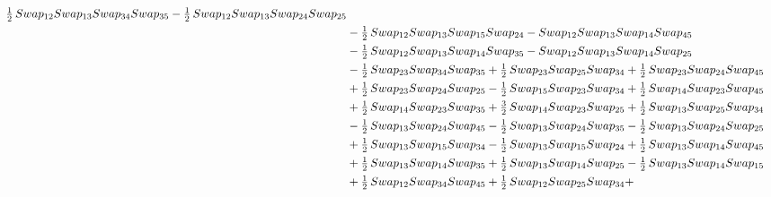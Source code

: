 \documentclass[10pt,a4paper]{amsart}
\begin{document}
\begin{align*}
        \tfrac12\,\textnormal{Swap}_{12} \textnormal{Swap}_{13} \textnormal{Swap}_{34} \textnormal{Swap}_{35} - \tfrac12\,\textnormal{Swap}_{12} \textnormal{Swap}_{13} \textnormal{Swap}_{24} \textnormal{Swap}_{25}\\ & - \tfrac12\,\textnormal{Swap}_{12} \textnormal{Swap}_{13} \textnormal{Swap}_{15} \textnormal{Swap}_{24} -
        \textnormal{Swap}_{12} \textnormal{Swap}_{13} \textnormal{Swap}_{14} \textnormal{Swap}_{45}\\ & - \tfrac12\,\textnormal{Swap}_{12} \textnormal{Swap}_{13} \textnormal{Swap}_{14} \textnormal{Swap}_{35} - \textnormal{Swap}_{12} \textnormal{Swap}_{13} \textnormal{Swap}_{14} \textnormal{Swap}_{25} \\ &-
        \tfrac12\,\textnormal{Swap}_{23} \textnormal{Swap}_{34} \textnormal{Swap}_{35} + \tfrac12\,\textnormal{Swap}_{23} \textnormal{Swap}_{25} \textnormal{Swap}_{34} + \tfrac12\,\textnormal{Swap}_{23} \textnormal{Swap}_{24} \textnormal{Swap}_{45}\\ & + \tfrac12\,\textnormal{Swap}_{23} \textnormal{Swap}_{24} \textnormal{Swap}_{25} -
        \tfrac12\,\textnormal{Swap}_{15} \textnormal{Swap}_{23} \textnormal{Swap}_{34} + \tfrac12\,\textnormal{Swap}_{14} \textnormal{Swap}_{23} \textnormal{Swap}_{45}\\ & + \tfrac12\,\textnormal{Swap}_{14} \textnormal{Swap}_{23} \textnormal{Swap}_{35} + \tfrac32\,\textnormal{Swap}_{14} \textnormal{Swap}_{23} \textnormal{Swap}_{25} +
        \tfrac12\,\textnormal{Swap}_{13} \textnormal{Swap}_{25} \textnormal{Swap}_{34}\\ & - \tfrac12\,\textnormal{Swap}_{13} \textnormal{Swap}_{24} \textnormal{Swap}_{45} - \tfrac12\,\textnormal{Swap}_{13} \textnormal{Swap}_{24} \textnormal{Swap}_{35} - \tfrac12\,\textnormal{Swap}_{13} \textnormal{Swap}_{24} \textnormal{Swap}_{25}\\ & +
        \tfrac12\,\textnormal{Swap}_{13} \textnormal{Swap}_{15} \textnormal{Swap}_{34} - \tfrac12\,\textnormal{Swap}_{13} \textnormal{Swap}_{15} \textnormal{Swap}_{24} + \tfrac12\,\textnormal{Swap}_{13} \textnormal{Swap}_{14} \textnormal{Swap}_{45}\\ & + \tfrac12\,\textnormal{Swap}_{13} \textnormal{Swap}_{14} \textnormal{Swap}_{35} +
        \tfrac12\,\textnormal{Swap}_{13} \textnormal{Swap}_{14} \textnormal{Swap}_{25} - \tfrac12\,\textnormal{Swap}_{13} \textnormal{Swap}_{14} \textnormal{Swap}_{15}\\ & + \tfrac12\,\textnormal{Swap}_{12} \textnormal{Swap}_{34} \textnormal{Swap}_{45} + \tfrac12\,\textnormal{Swap}_{12} \textnormal{Swap}_{25} \textnormal{Swap}_{34} +

\end{align*}
\end{document}
